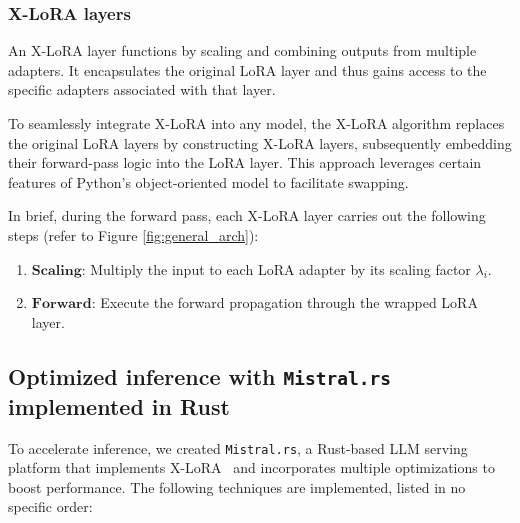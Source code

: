 \subsubsection{X-LoRA layers} An X-LoRA layer functions by scaling and combining outputs from multiple adapters. It encapsulates the original LoRA layer and thus gains access to the specific adapters associated with that layer.

To seamlessly integrate X-LoRA into any model, the X-LoRA algorithm replaces the original LoRA layers by constructing X-LoRA layers, subsequently embedding their forward-pass logic into the LoRA layer. This approach leverages certain features of Python’s object-oriented model to facilitate swapping.

In brief, during the forward pass, each X-LoRA layer carries out the following steps (refer to Figure \ref{fig:general_arch}):

\begin{enumerate}
    \item $\mathbf{Scaling}$: Multiply the input to each LoRA adapter by its scaling factor $\lambda_i$.
    \item $\mathbf{Forward}$: Execute the forward propagation through the wrapped LoRA layer.
\end{enumerate}

\subsection{Optimized inference with \texttt{Mistral.rs} implemented in Rust} To accelerate inference, we created \texttt{Mistral.rs}, a Rust-based LLM serving platform that implements X-LoRA~\cite{matsakis2014rust} and incorporates multiple optimizations to boost performance. The following techniques are implemented, listed in no specific order:

